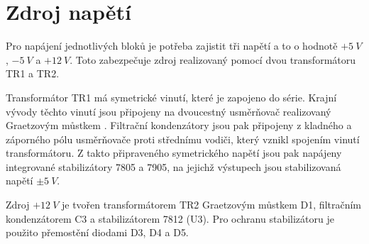 \section{Zdroj napětí}
\indent\indent Pro napájení jednotlivých bloků je potřeba zajistit tři napětí a to o hodnotě $+5~V$, $-5~V$ a $+12~V$. Toto zabezpečuje zdroj realizovaný pomocí dvou transformátoru  TR1 a TR2.

Transformátor TR1 má symetrické vinutí, které je zapojeno do série. Krajní vývody těchto vinutí jsou připojeny na dvoucestný usměrňovač realizovaný Graetzovým můstkem . Filtrační kondenzátory jsou pak připojeny z kladného a záporného pólu usměrňovače proti střednímu vodiči, který vznikl spojením vinutí transformátoru. Z takto připraveného symetrického napětí jsou pak napájeny integrované stabilizátory 7805 a 7905, na jejichž výstupech jsou stabilizovaná napětí $\pm5~V$.

Zdroj $+12~V$ je tvořen transformátorem TR2 Graetzovým můstkem D1, filtračním kondenzátorem C3 a stabilizátorem 7812 (U3). Pro ochranu stabilizátoru je použito přemostění diodami D3, D4 a D5.



